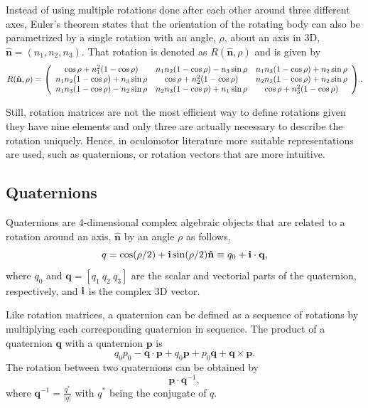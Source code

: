 Instead of using multiple rotations done after each other around three different axes, Euler's theorem states that the orientation of the rotating body can also be parametrized by a single rotation with an angle, $\rho$, about an axis in 3D, $\hat{\mathbf{n}} = (n_1, n_2, n_3)$. That rotation is denoted as $R(\hat{\mathbf{n}}, \rho)$ and is given by 
\begin{equation}
R ( \hat { \mathbf{n} } , \rho ) = \left( \begin{array} { c c c } { \cos \rho + n _ { 1 } ^ { 2 } ( 1 - \cos \rho ) } & { n _ { 1 } n _ { 2 } ( 1 - \cos \rho ) - n _ { 3 } \sin \rho } & { n _ { 1 } n _ { 3 } ( 1 - \cos \rho ) + n _ { 2 } \sin \rho } \\ { n _ { 1 } n _ { 2 } ( 1 - \cos \rho ) + n _ { 3 } \sin \rho } & { \cos \rho + n _ { 2 } ^ { 2 } ( 1 - \cos \rho ) } & { n _ { 2 } n _ { 3 } ( 1 - \cos \rho ) + n _ { 2 } \sin \rho } \\ { n _ { 1 } n _ { 3 } ( 1 - \cos \rho ) - n _ { 2 } \sin \rho } & { n _ { 2 } n _ { 3 } ( 1 - \cos \rho ) + n _ { 1 } \sin \rho } & { \cos \rho + n _ { 3 } ^ { 2 } ( 1 - \cos \rho ) } \end{array} \right).
\end{equation}

Still, rotation matrices are not the most efficient way to define rotations given they have nine elements and only three are actually necessary to describe the rotation uniquely. Hence, in oculomotor literature more suitable representations are used, such as quaternions, or rotation vectors that are more intuitive. \cite{rep}\cite{mathrot}

\subsection{Quaternions}
\label{cha2:represent:quat}
Quaternions are 4-dimensional complex algebraic objects that are related to a rotation around an axis, $\hat{ \mathbf{n}}$ by an angle $\rho$ as follows,
\begin{equation}
\label{sec2:eq:q}
q = \cos ( \rho / 2 ) + \mathbf{i} \sin ( \rho / 2 ) \mathbf{\hat{n}} \equiv q _ { 0 } + {\bf i}\cdot  {\bf q},
\end{equation}
where $q_0$ and $\mathbf{q} = [q_1 \ q_2 \ q_3]$ are the scalar and vectorial parts of the quaternion, respectively, and ${\bf i}$ is the complex 3D vector. 

Like rotation matrices, a quaternion can be defined as a sequence of rotations by multiplying each corresponding quaternion in sequence.
The product of a quaternion $\mathbf{q}$ with a quaternion $\mathbf{p}$ is 
\begin{equation}
	q_0 p_0 - \mathbf{q} \cdot \mathbf{p} + q_0 \mathbf{p} + p_0 \mathbf{q} + \mathbf{q} \times \mathbf{p}.
\end{equation}
The rotation between two quaternions can be obtained by 
\begin{equation}
\mathbf{p} \cdot \mathbf{q}^{-1},
\end{equation}
where $\mathbf{q}^{-1} = \frac{q^*}{|q|}$ with $q^*$ being the conjugate of $q$.

